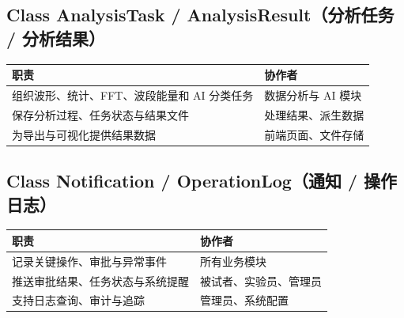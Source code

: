 \subsection{Class AnalysisTask / AnalysisResult（分析任务 / 分析结果）}

\begin{longtable}{|p{84mm}|p{54mm}|}
\hline
\textbf{职责} & \textbf{协作者} \\
\hline
组织波形、统计、FFT、波段能量和 AI 分类任务 & 数据分析与 AI 模块 \\
\hline
保存分析过程、任务状态与结果文件 & 处理结果、派生数据 \\
\hline
为导出与可视化提供结果数据 & 前端页面、文件存储 \\
\hline
\end{longtable}

\subsection{Class Notification / OperationLog（通知 / 操作日志）}

\begin{longtable}{|p{84mm}|p{54mm}|}
\hline
\textbf{职责} & \textbf{协作者} \\
\hline
记录关键操作、审批与异常事件 & 所有业务模块 \\
\hline
推送审批结果、任务状态与系统提醒 & 被试者、实验员、管理员 \\
\hline
支持日志查询、审计与追踪 & 管理员、系统配置 \\
\hline
\end{longtable}
